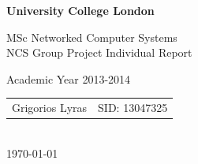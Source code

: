 \begin{titlepage}

\begin{center}
\begin{LARGE}\textbf{
University College London\\}\end{LARGE}
\vspace{2cm}
\begin{Large}
MSc Networked Computer Systems\\
NCS Group Project Individual Report\\
\end{Large}
\large{Academic Year 2013-2014}\\
\vfill
\begin{tabular}{l r}
\Large{Grigorios Lyras}&
\large{SID: 13047325}\\
\end{tabular}\\
\vspace{1cm}
\large\today\\
\end{center}
\end{titlepage}

